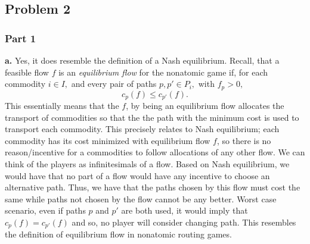 \documentclass[12 pt]{article}
\begin{document}
	\subsection*{Problem 2} 
	
	\subsubsection*{Part 1}
	
	\noindent \textbf{a.} Yes, it does resemble the definition of a Nash equilibrium. Recall, that a feasible flow $f$ is an	\emph{equilibrium flow} for the nonatomic game if, for each commodity
	$i \in I,$ and every pair of paths $p,p' \in P_i,$ with $f_p >0,$ $$c_p(f) \leq c_{p'}(f).$$
	This essentially means that the $f$, by being an equilibrium flow allocates the transport of commodities so that the the path with the minimum cost is used to transport each commodity. This precisely relates to Nash equilibrium; each commodity has its cost minimized with equilibrium flow $f$, so there is no reason/incentive for a commodities to follow allocations of any other flow. We can think of the players as infinitesimals of a flow. Based on Nash equilibrium, we would have that no part of a flow would have any incentive to choose an alternative path. Thus, we have that the paths chosen by this flow must cost the same while paths not chosen by the flow cannot be any better. Worst case scenario, even if paths $p$ and $p'$ are both used, it would imply that $c_p(f) = c_{p'}(f)$ and so, no player will consider changing path. This resembles the definition of equilibrium flow in nonatomic routing games. \\
	
\end{document}
